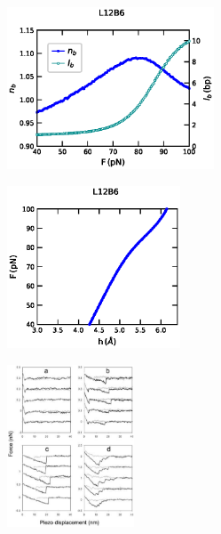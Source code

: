 \documentclass[12pt,masters,final]{UTRGVthesis}
\begin{document}
\begin{figure}[!h]
        \begin{subfigure}[b]{0.49\textwidth}
                \centering
                \includegraphics[height=1.9in, width=.8\textwidth]{L12B6_Pope_force_bub.eps}
                \caption{}
                \label{fig:L12B6bub}
        \end{subfigure}%
        \hspace{1pt}
        \hfill
        \begin{subfigure}[b]{0.49\textwidth}
                \centering
                \includegraphics[height=1.9in, width=.8\textwidth]{L12B6_Pope_force_extension.eps}
                \caption{}
                \label{fig:L12B6extension}
        \end{subfigure}%
        \hspace{1pt}
         \begin{subfigure}[b]{0.6\textwidth}
                \centering
                \includegraphics[height=1.9in, width=.8\textwidth]{experimental_pope.eps}
                \caption{}
                \label{fig:L12B6exp}
        \end{subfigure}
       

\end{figure}
\end{document}
